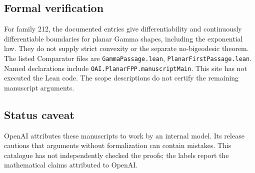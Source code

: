 \documentclass[11pt]{article}
\begin{document}
\subsection{Formal verification}
For family 212, the documented entries give differentiability and continuously differentiable boundaries for planar Gamma shapes, including the exponential law. They do not supply strict convexity or the separate no-bigeodesic theorem. The listed Comparator files are \texttt{GammaPassage.lean}, \texttt{PlanarFirstPassage.lean}. Named declarations include \texttt{OAI.PlanarFPP.manuscriptMain}. This site has not executed the Lean code. The scope descriptions do not certify the remaining manuscript arguments.

\subsection{Status caveat}
OpenAI attributes these manuscripts to work by an internal model. Its release cautions that arguments without formalization can contain mistakes. This catalogue has not independently checked the proofs; the labels report the mathematical claims attributed to OpenAI.
\end{document}
